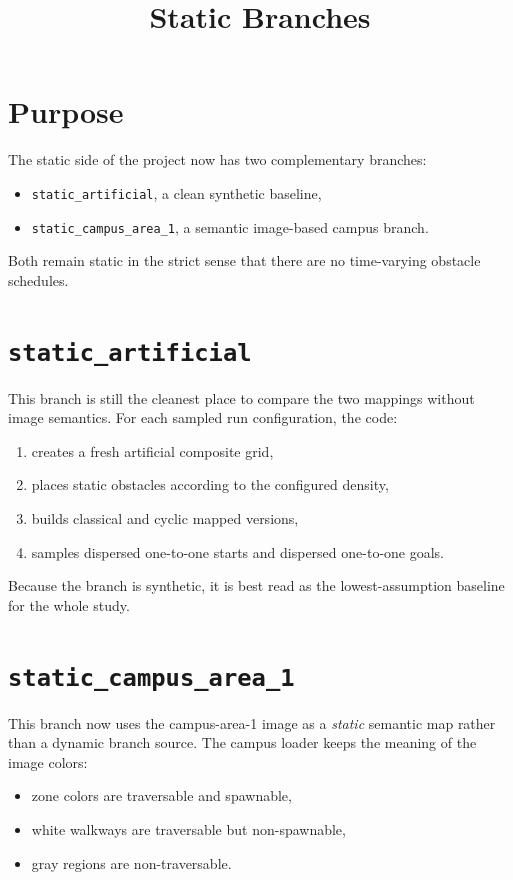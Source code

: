 \documentclass[11pt]{article}
\title{Static Branches}
\author{}
\date{}
\begin{document}
\maketitle

\section{Purpose}

The static side of the project now has two complementary branches:
\begin{itemize}[leftmargin=2em]
    \item \texttt{static\_artificial}, a clean synthetic baseline,
    \item \texttt{static\_campus\_area\_1}, a semantic image-based campus branch.
\end{itemize}

Both remain static in the strict sense that there are no time-varying obstacle schedules.

\section{\texttt{static\_artificial}}

This branch is still the cleanest place to compare the two mappings without image semantics. For each sampled run configuration, the code:
\begin{enumerate}[leftmargin=2em]
    \item creates a fresh artificial composite grid,
    \item places static obstacles according to the configured density,
    \item builds classical and cyclic mapped versions,
    \item samples dispersed one-to-one starts and dispersed one-to-one goals.
\end{enumerate}

Because the branch is synthetic, it is best read as the lowest-assumption baseline for the whole study.

\section{\texttt{static\_campus\_area\_1}}

This branch now uses the campus-area-1 image as a \emph{static} semantic map rather than a dynamic branch source. The campus loader keeps the meaning of the image colors:
\begin{itemize}[leftmargin=2em]
    \item zone colors are traversable and spawnable,
    \item white walkways are traversable but non-spawnable,
    \item gray regions are non-traversable.
\end{itemize}
\end{document}
